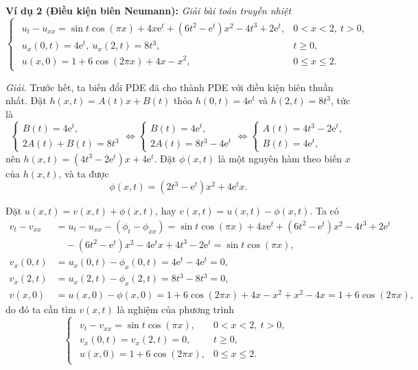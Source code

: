 \documentclass[10pt, a4paper]{article}
\begin{document}
	\textbf{Ví dụ 2 (Điều kiện biên Neumann):} \textit{Giải bài toán truyền nhiệt} $$\begin{cases}
		\begin{array}{ll}
			u_{t}-u_{xx}=\sin t\cos(\pi x)+4x\mathrm e^t+(6t^2-\mathrm e^t)x^2-4t^3+2\mathrm e^t, & 0<x<2,~t>0,\\
			u_x(0,t)=4\mathrm e^t,~u_x(2,t)=8t^3, & t\ge0,\\
			u(x,0)=1+6\cos(2\pi x)+4x-x^2, & 0\le x\le 2.
		\end{array}
	\end{cases}$$
	
	\textit{Giải.} Trước hết, ta biến đổi PDE đã cho thành PDE với điều kiện biên thuần nhất. Đặt $h(x,t)=A(t)x+B(t)$ thỏa $h(0,t)=4\mathrm e^t$ và $h(2,t)=8t^3$, tức là $$\begin{cases}
		B(t)=4\mathrm e^t,\\
		2A(t)+B(t)=8t^3
	\end{cases}\iff\begin{cases}
		B(t)=4\mathrm e^t,\\
		2A(t)=8t^3-4\mathrm e^t
	\end{cases}\iff\begin{cases}
		A(t)=4t^3-2\mathrm e^t,\\
		B(t)=4\mathrm e^t,
	\end{cases}$$
	nên $h(x,t)=(4t^3-2\mathrm e^t)x+4\mathrm e^t$. Đặt $\phi(x,t)$ là một nguyên hàm theo biến $x$ của $h(x,t)$, và ta được $$\phi(x,t)=(2t^3-\mathrm e^t)x^2+4\mathrm e^tx.$$
	
	Đặt $u(x,t)=v(x,t)+\phi(x,t)$, hay $v(x,t)=u(x,t)-\phi(x,t)$. Ta có \begin{align*}
		v_{t}-v_{xx}&=u_{t}-u_{xx}-(\phi_{t}-\phi_{xx})=\sin t\cos(\pi x)+4x\mathrm e^t+(6t^2-\mathrm e^t)x^2-4t^3+2\mathrm e^t\\
		&\,\,\,\,\,\,-(6t^2-\mathrm e^t)x^2-4\mathrm e^tx+4t^3-2\mathrm e^t=\sin t\cos(\pi x),\\
		v_x(0,t)&=u_x(0,t)-\phi_x(0,t)=4\mathrm e^t-4\mathrm e^t=0,\\
		v_x(2,t)&=u_x(2,t)-\phi_x(2,t)=8t^3-8t^3=0,\\
		v(x,0)&=u(x,0)-\phi(x,0)=1+6\cos(2\pi x)+4x-x^2+x^2-4x=1+6\cos(2\pi x),
	\end{align*}
	do đó ta cần tìm $v(x,t)$ là nghiệm của phương trình $$\begin{cases}
		\begin{array}{ll}
			v_{t}-v_{xx}=\sin t\cos(\pi x), & 0<x<2,~t>0,\\
			v_x(0,t)=v_x(2,t)=0, & t\ge0,\\
			u(x,0)=1+6\cos(2\pi x), & 0\le x\le 2.
		\end{array}
	\end{cases}$$
	
\end{document}
